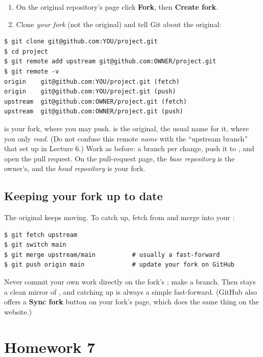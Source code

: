 \begin{enumerate}
  \item On the original repository's page click \textbf{Fork}, then \textbf{Create fork}.
  \item Clone \emph{your fork} (not the original) and tell Git about the original:
\end{enumerate}

\begin{lstlisting}
$ git clone git@github.com:YOU/project.git
$ cd project
$ git remote add upstream git@github.com:OWNER/project.git
$ git remote -v
origin    git@github.com:YOU/project.git (fetch)
origin    git@github.com:YOU/project.git (push)
upstream  git@github.com:OWNER/project.git (fetch)
upstream  git@github.com:OWNER/project.git (push)
\end{lstlisting}

 is your fork, where you may push.  is the original, the usual name for it, where you only \emph{read}. (Do not confuse this remote \emph{name} with the ``upstream branch'' that  set up in Lecture 6.) Work as before: a branch per change, push it to , and open the pull request. On the pull-request page, the \emph{base repository} is the owner's, and the \emph{head repository} is your fork.

\subsection{Keeping your fork up to date}

The original keeps moving. To catch up, fetch from  and merge into your :

\begin{lstlisting}
$ git fetch upstream
$ git switch main
$ git merge upstream/main          # usually a fast-forward
$ git push origin main             # update your fork on GitHub
\end{lstlisting}

\begin{keyidea}
Never commit your own work directly on the fork's ; make a branch. Then  stays a clean mirror of , and catching up is always a simple fast-forward. (GitHub also offers a \textbf{Sync fork} button on your fork's page, which does the same thing on the website.)
\end{keyidea}

\section{Homework 7}

